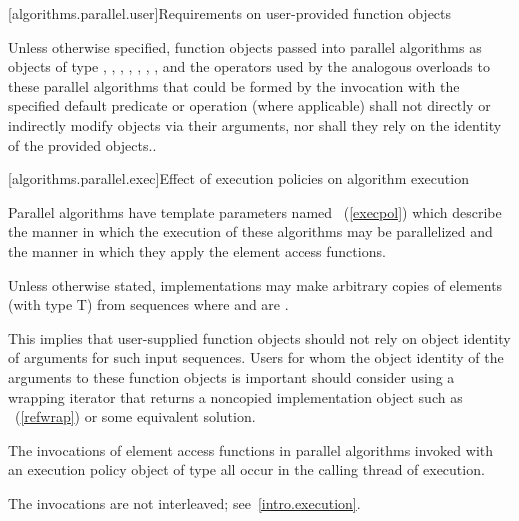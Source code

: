 [algorithms.parallel.user]{Requirements on user-provided function objects}

\pnum
Unless otherwise specified, function objects passed into parallel algorithms as
objects of type , , ,
, , ,
, and the operators used by the analogous overloads to
these parallel algorithms that could be formed by the invocation with the
specified default predicate or operation (where applicable) shall not directly
or indirectly modify objects via their arguments, nor shall they rely on the
identity of the provided objects..

[algorithms.parallel.exec]{Effect of execution policies on algorithm execution}

\pnum
Parallel algorithms have template parameters
named ~(\ref{execpol})
which describe the manner in which the execution of these algorithms may be
parallelized and the manner in which they apply the element access functions.

\pnum
Unless otherwise stated, implementations may make arbitrary copies of elements
(with type T) from sequences where 
and  are .
\begin{note}
This implies that user-supplied function objects should not rely on object
identity of arguments for such input sequences. Users for whom the object
identity of the arguments to these function objects is important should
consider using a wrapping iterator that returns a noncopied implementation
object such as ~(\ref{refwrap}) or some equivalent
solution.
\end{note}

\pnum
The invocations of element access functions in parallel algorithms invoked with
an execution policy object of type  all occur
in the calling thread of execution.
\begin{note}
The invocations are not interleaved; see~\ref{intro.execution}.
\end{note}

